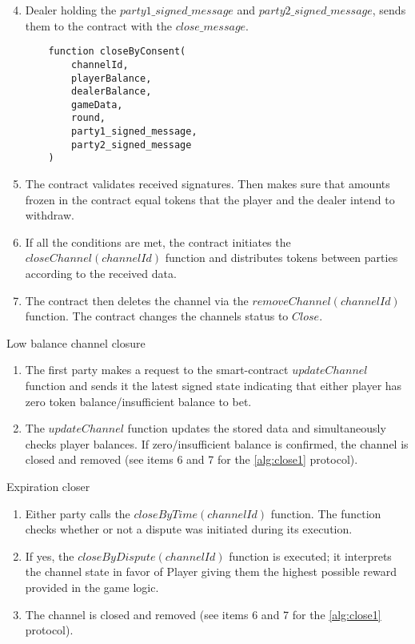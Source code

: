 \begin{algorithm}
\begin{enumerate}
\setcounter{enumi}{3}
	\item Dealer holding the $party1\_signed\_message$ and $party2\_signed\_message$, sends them to the contract with the $close\_message$. \label{deal_sig}
\begin{lstlisting}
    function closeByConsent(
        channelId,
        playerBalance,
        dealerBalance,
        gameData,
        round,
        party1_signed_message,
        party2_signed_message 
    )
\end{lstlisting}
	\item The contract validates received signatures. Then makes sure that amounts frozen in the contract equal tokens that the player and the dealer intend to withdraw.
	\item If all the conditions are met, the contract initiates the $closeChannel(channelId)$ function and distributes tokens between parties according to the received data.
	\item The contract then deletes the channel via the $removeChannel(channelId)$ function. The contract changes the channels status to $Close$.
\end{enumerate}
\end{algorithm}

\begin{algorithm}[H]
\caption{Low balance channel closure} \label{alg:close2}
\begin{enumerate}
	\item The first party makes a request to the smart-contract $updateChannel$ function and sends it the latest signed state indicating that either player has zero token balance/insufficient balance to bet.
	\item The $updateChannel$ function updates the stored data and simultaneously checks player balances. If zero/insufficient balance is confirmed, the channel is closed and removed (see items 6 and 7 for the \autoref{alg:close1} protocol).
\end{enumerate}
\end{algorithm}

\begin{algorithm}[H]
\caption{Expiration closer} \label{alg:close3}
 \begin{enumerate}
	\item Either party calls the $closeByTime(channelId)$ function. The function checks whether or not a dispute was initiated during its execution.
	\item If yes, the $closeByDispute(channelId)$ function is executed; it interprets the channel state in favor of Player giving them the highest possible reward provided in the game logic. 
	\item The channel is closed and removed (see items 6 and 7 for the \autoref{alg:close1} protocol).
\end{enumerate}
\end{algorithm}

